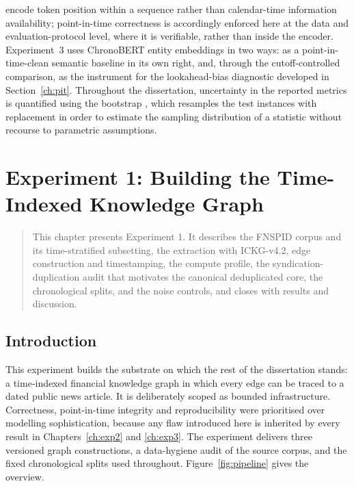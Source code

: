 \documentclass[a4paper,12pt]{report}
\newenvironment{microabstract}{\begin{quotation}\noindent}{\end{quotation}}
\begin{document}
encode token position within a sequence rather than calendar-time information
availability; point-in-time correctness is accordingly enforced here at the
data and evaluation-protocol level, where it is verifiable, rather than inside
the encoder. Experiment~3 uses
ChronoBERT entity embeddings in two ways: as a point-in-time-clean semantic
baseline in its own right, and, through the cutoff-controlled comparison, as the
instrument for the lookahead-bias diagnostic developed in Section~\ref{ch:pit}.
Throughout the dissertation, uncertainty in the reported metrics is quantified
using the bootstrap \citep{Efron1979Bootstrap}, which resamples the test
instances with replacement in order to estimate the sampling distribution of a
statistic without recourse to parametric assumptions.

\chapter{Experiment 1: Building the Time-Indexed Knowledge Graph}
\label{ch:exp1}
\begin{microabstract}
This chapter presents Experiment 1. It describes the FNSPID corpus and
its time-stratified subsetting, the extraction with ICKG-v4.2, edge
construction and timestamping, the compute profile, the
syndication-duplication audit that motivates the canonical deduplicated
core, the chronological splits, and the noise controls, and closes with
results and discussion.
\end{microabstract}

\section{Introduction}
This experiment builds the substrate on which the rest of the dissertation
stands: a time-indexed financial knowledge graph in which every edge can be
traced to a dated public news article. It is deliberately scoped as bounded
infrastructure. Correctness, point-in-time integrity and reproducibility were
prioritised over modelling sophistication, because any flaw introduced here is
inherited by every result in Chapters~\ref{ch:exp2} and \ref{ch:exp3}. The
experiment delivers three versioned graph constructions, a data-hygiene audit
of the source corpus, and the fixed chronological splits used throughout.
Figure~\ref{fig:pipeline} gives the overview.
\end{document}
